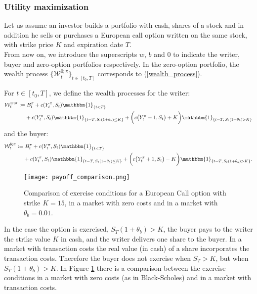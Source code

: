 \subsubsection{Utility maximization}


Let us assume an investor builds a portfolio with cash, shares of a stock and in addition he sells or purchases a 
European call option written on the same stock, with strike price $K$ and expiration date $T$.\\
From now on, we introduce the superscripts $w$, $b$ and $0$ to indicate the writer, buyer and zero-option portfolios respectively.
In the zero-option portfolio, the wealth process $\{\mathcal{W}^{0; \pi}_t\}_{t \in [t_0,T]}$ corresponds to (\ref{wealth_process}).
\begin{Definition}
For $t \in [t_0,T]$, we define the wealth processes for the writer:
  \begin{align}\label{wealth_writer}
   \mathcal{W}^{w; \pi}_t := & \; B^{\pi}_t + c(Y^{\pi}_t,S_t) \mathbbm{1}_{\{t < T\}} \\ \nonumber
   & + c(Y^{\pi}_t,S_t) \mathbbm{1}_{\{t = T,\, S_t(1+ \theta_b ) \leq K\}}
   + \biggl( c\bigl( Y^{\pi}_t-1,S_t \bigr) + K \biggr) \mathbbm{1}_{\{t=T,\, S_t(1+ \theta_b ) > K \}}
  \end{align}
 and the buyer:
  \begin{align}\label{wealth_buyer}
   \mathcal{W}^{b; \pi}_t := & \; B^{\pi}_t + c(Y^{\pi}_t,S_t) \mathbbm{1}_{\{t < T\}} \\ \nonumber
   & + c(Y^{\pi}_t,S_t) \mathbbm{1}_{\{t = T,\, S_t(1+ \theta_b ) \leq K\}}
   + \biggl( c\bigl( Y^{\pi}_t+1,S_t \bigr) - K \biggr) \mathbbm{1}_{\{t=T,\, S_t(1+ \theta_b ) > K \}}.
  \end{align}
\end{Definition}

\begin{figure}[t!]
 \centering
 \texttt{[image: payoff\_comparison.png]}
 \caption{Comparison of exercise conditions for a European Call option with strike $K=15$, in a market with zero costs and in a market with $\theta_b=0.01$.}
 \label{fig:payoff_comparison}
\end{figure}
In the case the option is exercised, $S_T(1+ \theta_b ) > K$, the buyer pays to the writer the strike value $K$ in cash, 
and the writer delivers one share to the buyer.
In a market with transaction costs the real value (in cash) of a share incorporates the transaction costs. 
Therefore the buyer does not exercise when $S_T > K$, but when $S_T(1+ \theta_b ) > K$. 
In Figure \ref{fig:payoff_comparison} there is a comparison between the exercise conditions in a market with zero costs (as in Black-Scholes) and in a market with 
transaction costs.

